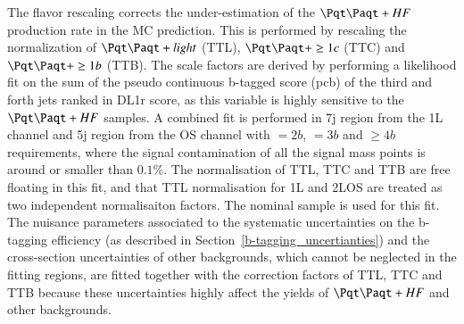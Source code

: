 The flavor rescaling corrects the under-estimation of the $\ttbar+HF$ production rate in the MC prediction. This is performed by rescaling the normalization of $\ttbar+light$ (TTL), $\ttbar+\ge 1c$ (TTC) and $\ttbar+\ge 1b$ (TTB). The scale factors are derived by performing a likelihood fit on the sum of the pseudo continuous b-tagged score (pcb) of the third and forth jets ranked in DL1r score, as this variable is highly sensitive to the $\ttbar+HF$ samples. A combined fit is performed in 7j region from the 1L channel and 5j region from the OS channel with $=2b$, $=3b$ and $\geq 4b$ requirements, where the signal contamination of all the signal mass points is around or smaller than $0.1\%$. The normalisation of TTL, TTC and TTB are free floating in this fit, and that TTL normalisation for 1L and 2LOS are treated as two independent normalisaiton factors. The nominal \ttbar sample is used for this fit. The nuisance parameters associated to the systematic uncertainties on the b-tagging efficiency (as described in Section~\ref{b-tagging_uncertianties}) and the cross-section uncertainties of other backgrounds, which cannot be neglected in the fitting regions, are fitted together with the correction factors of TTL, TTC and TTB because these uncertainties highly affect the yields of $\ttbar+HF$ and other backgrounds.


\begin{table}[th!]
    \centering
    \def\arraystretch{1.2}
    \caption{\label{tab:sigContam_HFCorrRegion}The signal (BSMtttt M700) over background ratio in each of the regions used to derive the HF rescaling factors before any scaling applied.}
\end{table}

